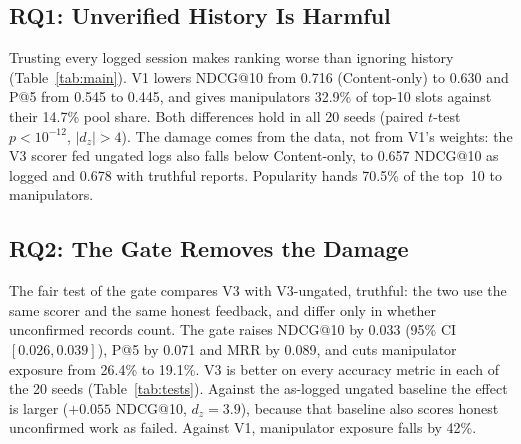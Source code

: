 \documentclass[conference]{IEEEtran}
\begin{document}
\begin{table}[t]
\centering
\caption{Paired differences, V3 minus each alternative, over 20 seeds. $\Delta$Manip and $\Delta$New are in percentage points. $^{*}$: Holm-corrected $p<0.05$ under both the paired $t$-test and the Wilcoxon test.}
\label{tab:tests}
\footnotesize
\setlength{\tabcolsep}{3pt}
\renewcommand{\arraystretch}{1.12}
\end{table}

\subsection{RQ1: Unverified History Is Harmful}
Trusting every logged session makes ranking worse than ignoring history (Table~\ref{tab:main}). V1 lowers NDCG@10 from 0.716 (Content-only) to 0.630 and P@5 from 0.545 to 0.445, and gives manipulators 32.9\% of top-10 slots against their 14.7\% pool share. Both differences hold in all 20 seeds (paired $t$-test $p<10^{-12}$, $|d_z|>4$). The damage comes from the data, not from V1's weights: the V3 scorer fed ungated logs also falls below Content-only, to 0.657 NDCG@10 as logged and 0.678 with truthful reports. Popularity hands 70.5\% of the top~10 to manipulators.

\subsection{RQ2: The Gate Removes the Damage}
The fair test of the gate compares V3 with V3-ungated, truthful: the two use the same scorer and the same honest feedback, and differ only in whether unconfirmed records count. The gate raises NDCG@10 by 0.033 (95\% CI $[0.026,0.039]$), P@5 by 0.071 and MRR by 0.089, and cuts manipulator exposure from 26.4\% to 19.1\%. V3 is better on every accuracy metric in each of the 20 seeds (Table~\ref{tab:tests}). Against the as-logged ungated baseline the effect is larger ($+0.055$ NDCG@10, $d_z=3.9$), because that baseline also scores honest unconfirmed work as failed. Against V1, manipulator exposure falls by 42\%.
\end{document}
